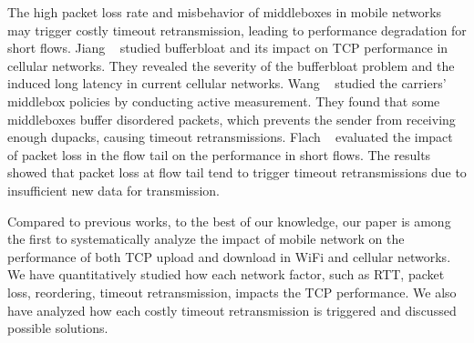 The high packet loss rate and misbehavior of middleboxes in mobile networks may trigger costly timeout retransmission, leading to performance degradation for short flows. Jiang \etal~\cite{jiang2012tackling} studied bufferbloat and its impact on TCP performance in cellular networks. They revealed the severity of the bufferbloat problem and the induced long latency in current cellular networks. Wang \etal~\cite{Wang:2011:USM:2018436.2018479} studied the carriers' middlebox policies by conducting active measurement. They found that some middleboxes buffer disordered packets, which prevents the sender from receiving enough dupacks, causing timeout retransmissions. Flach \etal~\cite{flach2013reducing} evaluated the impact of packet loss in the flow tail on the performance in short flows. The results showed that packet loss at flow tail tend to trigger timeout retransmissions due to insufficient new data for transmission.

Compared to previous works, to the best of our knowledge, our paper is among the first to systematically analyze the impact of mobile network on the performance of both TCP upload and download in WiFi and cellular networks. We have quantitatively studied how each network factor, such as RTT, packet loss, reordering, timeout retransmission, impacts the TCP performance. We also have analyzed how each costly timeout retransmission is triggered and discussed possible solutions.